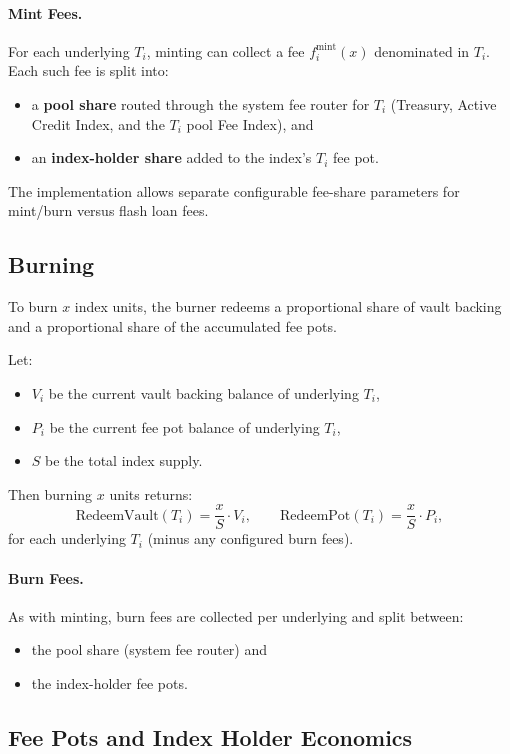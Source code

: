 \documentclass[version=preprint]{iacrcc}
\begin{document}
\paragraph{Mint Fees.}
For each underlying $T_i$, minting can collect a fee $f^{\text{mint}}_{i}(x)$ denominated in $T_i$. Each such fee is split into:
\begin{itemize}
  \item a \textbf{pool share} routed through the system fee router for $T_i$ (Treasury, Active Credit Index, and the $T_i$ pool Fee Index), and
  \item an \textbf{index-holder share} added to the index's $T_i$ fee pot.
\end{itemize}
The implementation allows separate configurable fee-share parameters for mint/burn versus flash loan fees.

\subsection{Burning}

To burn $x$ index units, the burner redeems a proportional share of vault backing and a proportional share of the accumulated fee pots.

Let:
\begin{itemize}
  \item $V_i$ be the current vault backing balance of underlying $T_i$,
  \item $P_i$ be the current fee pot balance of underlying $T_i$,
  \item $S$ be the total index supply.
\end{itemize}
Then burning $x$ units returns:
\[
\text{RedeemVault}(T_i) = \frac{x}{S} \cdot V_i,
\qquad
\text{RedeemPot}(T_i) = \frac{x}{S} \cdot P_i,
\]
for each underlying $T_i$ (minus any configured burn fees).

\paragraph{Burn Fees.}
As with minting, burn fees are collected per underlying and split between:
\begin{itemize}
  \item the pool share (system fee router) and
  \item the index-holder fee pots.
\end{itemize}

\subsection{Fee Pots and Index Holder Economics}
\end{document}
